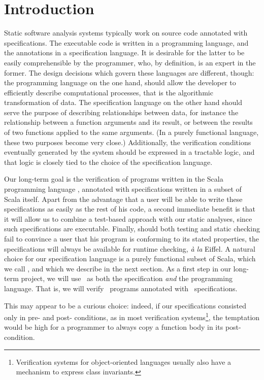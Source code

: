 \section{Introduction}
Static software analysis systems typically work on source code annotated with
specifications. The executable code is written in a programming language, and
the annotations in a specification language. It is desirable for the latter to
be easily comprehensible by the programmer, who, by definition, is an expert in
the former. The design decisions which govern these languages are different,
though: the programming language on the one hand, should allow the developer to
efficiently describe computational processes, that is the algorithmic
transformation of data. The specification language on the other hand should
serve the purpose of describing relationships between data, for instance the
relationship between a function arguments and its result, or between the
results of two functions applied to the same arguments. (In a purely functional
language, these two purposes become very close.) Additionally, the verification
conditions eventually generated by the system should be expressed in a
tractable logic, and that logic is closely tied to the choice of the
specification language.

Our long-term goal is the verification of programs written in the Scala
programming language \cite{scalalang}, annotated with specifications written in
a subset of Scala itself. Apart from the advantage that a user will be able to
write these specifications as easily as the rest of his code, a second
immediate benefit is that it will allow us to combine a test-based approach
with our static analyses, since such specifications are executable. Finally,
should both testing and static checking fail to convince a user that his
program is conforming to its stated properties, the specifications will always
be available for runtime checking, {\it \`a la} Eiffel. A natural choice for
our specification language is a purely functional subset of Scala, which we
call \purescala, and which we describe in the next section. As a first step in
our long-term project, we will use \purescala\ as both the specification
\emph{and} the programming language. That is, we will verify \purescala\
programs annotated with \purescala\ specifications.

This may appear to be a curious choice: indeed, if our specifications consisted
only in pre- and post- conditions, as in most verification
systems\footnote{Verification systems for object-oriented languages usually
also have a mechanism to express class invariants.}, the temptation would be
high for a programmer to always copy a function body in its post-condition.
